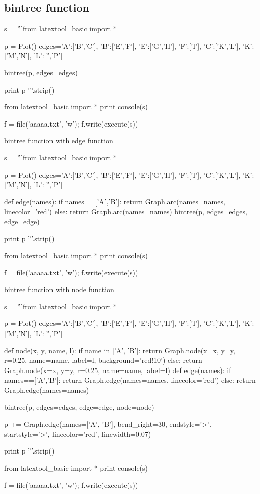 \newpage
\subsection{bintree function}

\begin{python}
s = '''from latextool_basic import *

p = Plot()
edges={'A':['B','C'],
       'B':['E','F'],
       'E':['G','H'],
       'F':['I'],
       'C':['K','L'],
       'K':['M','N'],
       'L':['','P']}

bintree(p, edges=edges)

print p
'''.strip()

from latextool_basic import *
print console(s)

f = file('aaaaa.txt', 'w'); f.write(execute(s))
\end{python}





\newpage
bintree function with edge function
\begin{python}
s = '''from latextool_basic import *

p = Plot()
edges={'A':['B','C'],
       'B':['E','F'],
       'E':['G','H'],
       'F':['I'],
       'C':['K','L'],
       'K':['M','N'],
       'L':['','P']}

def edge(names):
    if names==['A','B']:
        return Graph.arc(names=names, linecolor='red')
    else:
        return Graph.arc(names=names)
bintree(p, edges=edges, edge=edge)

print p
'''.strip()

from latextool_basic import *
print console(s)

f = file('aaaaa.txt', 'w'); f.write(execute(s))
\end{python}




\newpage
bintree function with node function
\begin{python}
s = '''from latextool_basic import *

p = Plot()
edges={'A':['B','C'],
       'B':['E','F'],
       'E':['G','H'],
       'F':['I'],
       'C':['K','L'],
       'K':['M','N'],
       'L':['','P']}

def node(x, y, name, l):
    if name in ['A', 'B']:
        return Graph.node(x=x, y=y, r=0.25, name=name, label=l, background='red!10')
    else:
        return Graph.node(x=x, y=y, r=0.25, name=name, label=l)
def edge(names):
    if names==['A','B']:
        return Graph.edge(names=names, linecolor='red')
    else:
        return Graph.edge(names=names)

bintree(p, edges=edges, edge=edge, node=node)

p += Graph.edge(names=['A', 'B'],
     bend_right=30, 
     endstyle='>', startstyle='>', linecolor='red', linewidth=0.07)

print p
'''.strip()

from latextool_basic import *
print console(s)

f = file('aaaaa.txt', 'w'); f.write(execute(s))
\end{python}






